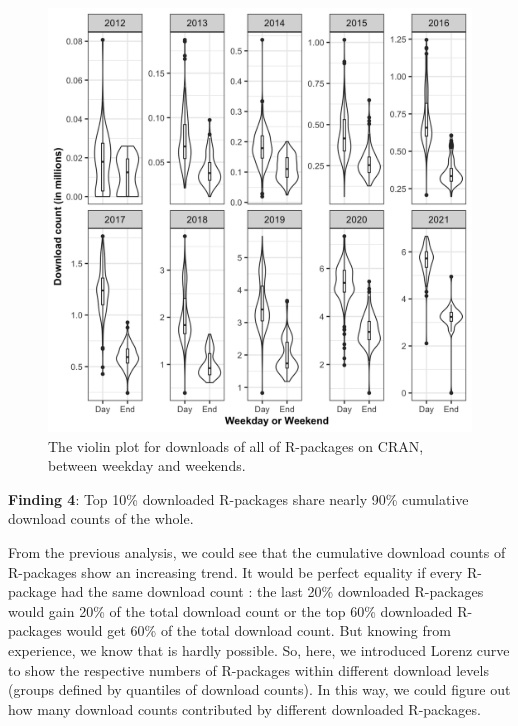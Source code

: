 \documentclass[
]{book}
\newenvironment{discovery}[1]{%
  \begin{tcolorbox}[colback=blue!30,colframe=blue!80!black]#1}{\end{tcolorbox}}
\begin{document}
\begin{figure}

{\centering \includegraphics{figures/weekend-vs-weekday-1} 

}

\caption{The violin plot for downloads of all of R-packages on CRAN, between weekday and weekends.}\label{fig:weekend-vs-weekday}
\end{figure}

\begin{discovery}
\textbf{Finding 4}: Top 10\% downloaded R-packages share nearly 90\%
cumulative download counts of the whole.
\end{discovery}

From the previous analysis, we could see that the cumulative download counts of R-packages show an increasing trend. It would be perfect equality if every R-package had the same download count : the last 20\% downloaded R-packages would gain 20\% of the total download count or the top 60\% downloaded R-packages would get 60\% of the total download count. But knowing from experience, we know that is hardly possible. So, here, we introduced Lorenz curve\autocite{lorenz} to show the respective numbers of R-packages within different download levels (groups defined by quantiles of download counts). In this way, we could figure out how many download counts contributed by different downloaded R-packages.
\end{document}
